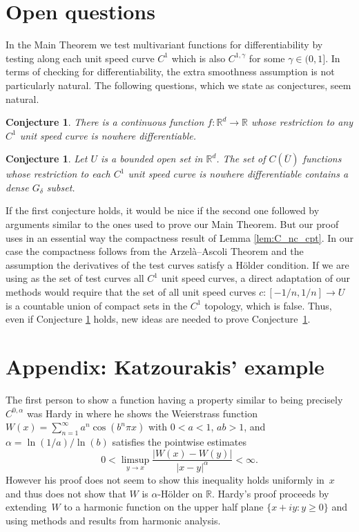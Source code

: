 \documentclass[12pt]{amsart}
\newcommand{\adj}{{precisely }} %
\numberwithin{equation}{section}
\newcommand{\R}{{\mathbb R}}		%
\newcommand{\cn}{\colon}                %
\newtheorem{conjecture}[thm]{Conjecture}
\theoremstyle{definition}
\theoremstyle{remark}
\begin{document}
\section{Open questions}


In the Main Theorem we test multivariant functions
for differentiability by testing along each unit speed curve $C^1$
which is also
$C^{1,\gamma}$ for some $\gamma\in (0,1]$.
In terms of checking for  differentiability,
the extra smoothness assumption is not particularly natural. 
The following questions,
which we state as conjectures, seem natural.


\begin{conjecture}\label{conj:1}
There is a continuous function $f\cn \R^d \to \R$ whose restriction
to any  $C^1$ unit speed curve is nowhere differentiable. 
\end{conjecture}


\begin{conjecture}\label{conj:2}
Let $U$ is a bounded open set in $\R^d$.
The set of  $C(\overline U)$ functions 
whose restriction to each  $C^1$ unit speed curve
is nowhere differentiable 
contains a dense $G_\delta$ subset.
\end{conjecture}


If
the first  conjecture holds, it would be nice if the second one
followed by  arguments similar to the ones used to prove our Main Theorem.
But our proof uses in an essential way the compactness result of Lemma
\ref{lem:C_nc_cpt}. In our case the compactness follows from 
the  Arzel\`a–Ascoli Theorem and the assumption the derivatives
of the test curves satisfy a H\"older condition.  If we are using
as the set of test curves all $C^1$ unit speed curves, a direct adaptation 
of our methods would require  that the set of all unit speed
curves $c\cn [-1/n,1/n]\to U$ is a countable union of compact sets
in the $C^1$ topology, which is false.
Thus, even if Conjecture \ref{conj:1} holds,
new ideas are  needed to prove Conjecture~\ref{conj:2}.



\section{Appendix: Katzourakis' example}


The
first person to show a function having a property similar to
being \adj  $C^{0,\alpha}$ was Hardy in \cite[Theorem~1.32]{Hardy:Reim_fcn}
where he shows the Weierstrass function
$W(x) = \sum_{n=1}^\infty a^n \cos(b^n\pi x)$
with $0<a<1$, $ab>1$, and $\alpha = \ln(1/a)/\ln(b)$ 
satisfies the pointwise estimates
$$
0 < \limsup_{y\to x} \frac{|W(x) - W(y)|}{|x-y|^\alpha} < \infty.
$$
However his proof does not seem to show this inequality
holds uniformly in~$x$ and thus   does not show
that $W$ is $\alpha$-H\"older on $\R$.  
Hardy's proof proceeds by extending~$W$ to a  harmonic function 
on the upper half plane $\{ x+iy: y\ge 0\}$  and   using methods
and results from harmonic analysis.
\end{document}
